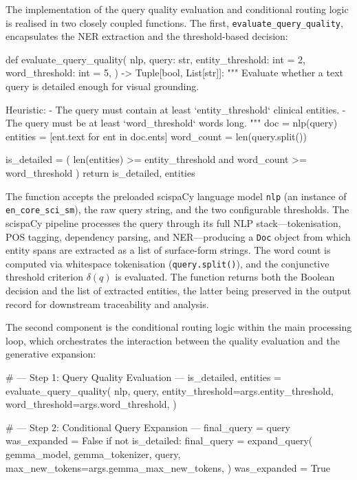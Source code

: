 The implementation of the query quality evaluation and conditional routing logic is realised in two closely coupled functions. The first, \texttt{evaluate\_query\_quality}, encapsulates the NER extraction and the threshold-based decision:

\begin{pythoncode}
def evaluate_query_quality(
    nlp,
    query: str,
    entity_threshold: int = 2,
    word_threshold: int = 5,
) -> Tuple[bool, List[str]]:
    """
    Evaluate whether a text query is detailed enough for visual grounding.

    Heuristic:
    - The query must contain at least `entity_threshold` clinical entities.
    - The query must be at least `word_threshold` words long.
    """
    doc = nlp(query)
    entities = [ent.text for ent in doc.ents]
    word_count = len(query.split())

    is_detailed = (
        len(entities) >= entity_threshold and word_count >= word_threshold
    )
    return is_detailed, entities
\end{pythoncode}

The function accepts the preloaded scispaCy language model \texttt{nlp} (an instance of \texttt{en\_core\_sci\_sm}), the raw query string, and the two configurable thresholds. The scispaCy pipeline processes the query through its full NLP stack---tokenisation, POS tagging, dependency parsing, and NER---producing a \texttt{Doc} object from which entity spans are extracted as a list of surface-form strings. The word count is computed via whitespace tokenisation (\texttt{query.split()}), and the conjunctive threshold criterion $\delta(q)$ is evaluated. The function returns both the Boolean decision and the list of extracted entities, the latter being preserved in the output record for downstream traceability and analysis.

The second component is the conditional routing logic within the main processing loop, which orchestrates the interaction between the quality evaluation and the generative expansion:

\begin{pythoncode}
# --- Step 1: Query Quality Evaluation ---
is_detailed, entities = evaluate_query_quality(
    nlp, query,
    entity_threshold=args.entity_threshold,
    word_threshold=args.word_threshold,
)

# --- Step 2: Conditional Query Expansion ---
final_query = query
was_expanded = False
if not is_detailed:
    final_query = expand_query(
        gemma_model, gemma_tokenizer,
        query,
        max_new_tokens=args.gemma_max_new_tokens,
    )
    was_expanded = True
\end{pythoncode}

